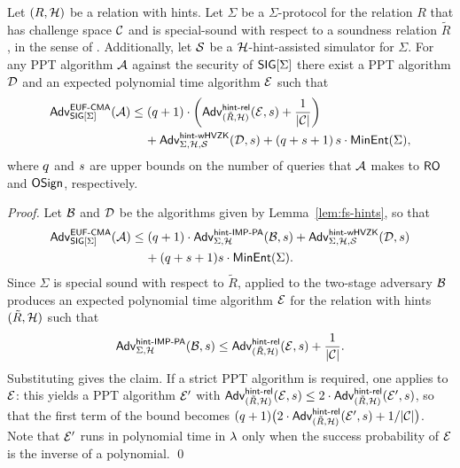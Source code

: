 \begin{theorem}\label{thm:EUFCMA-gen}
    Let $(R, \mathcal{H})$ be a relation with hints.
    Let $\Sigma$ be a $\Sigma$-protocol for the relation $R$ that has challenge
    space $\mathcal{C}$ and is special-sound with respect to a soundness relation
    $\tilde{R}$, in the sense of .
    Additionally, let $\operatorname{\mathcal{S}}$ be a $\mathcal{H}$-hint-assisted simulator for
    $\Sigma$.
    For any PPT algorithm $\mathcal{A}$ against the \EUFCMA security of $\mathsf{SIG}[\Sigma]$
    there exist a PPT algorithm $\mathcal{D}$ and an expected polynomial time algorithm
    $\mathcal{E}$ such that
    \begin{align*}
        \Advantage{\EUFCMA}{\SIG[\Sigma]}(\adv)
        &\leq \left(\numRO+1\right)\cdot
        \left(\hintreladv{\tilde{R}}{\hintdistr}{\cE}{\numOSign}
        + \frac{1}{\lvert \cC \rvert}\right) \\
        &\phantom{\leq ~}
        + \hinthvzkadv{\Sigma}{\hintdistr}{\Sim}{\ddv, \numOSign}
        + (\numRO + \numOSign + 1)\,\numOSign \cdot \minentropy{\Sigma},
    \end{align*}
    where $q$ and $s$ are upper bounds on the number of queries that
    $\mathcal{A}$ makes to $\mathsf{RO}$ and $\mathsf{OSign}$, respectively.
\end{theorem}

\begin{proof}
    Let $\mathcal{B}$ and $\mathcal{D}$ be the algorithms given by Lemma~\ref{lem:fs-hints}, so
    that
    \[
        \begin{aligned}
            \mathsf{Adv}^{\mathsf{EUF}\text{-}\mathsf{CMA}}_{\mathsf{SIG}[\Sigma]}(\mathcal{A})
            &\leq (q+1)\cdot\mathsf{Adv}^{\mathsf{hint}\text{-}\mathsf{IMP}\text{-}\mathsf{PA}}_{\Sigma,\mathcal{H}}(\mathcal{B},s)
            + \mathsf{Adv}^{\mathsf{hint}\text{-}\mathsf{wHVZK}}_{\Sigma,\mathcal{H}, \operatorname{\mathcal{S}}}(\mathcal{D}, s) \\
            &\phantom{\leq ~}
            + (q+s+1)s\cdot\mathsf{MinEnt}(\Sigma).
        \end{aligned}
    \]
    Since $\Sigma$ is special sound with respect to $\tilde{R}$,
     applied to the two-stage adversary $\mathcal{B}$
    produces an expected polynomial time algorithm $\mathcal{E}$ for the relation with
    hints $(\tilde{R}, \mathcal{H})$ such that
    \[
        \hintimppaadv{\Sigma}{\hintdistr}{\bdv}{\numOSign}
        \leq \hintreladv{\tilde{R}}{\hintdistr}{\cE}{\numOSign}
        + \frac{1}{\abs{\cC}}.
    \]
    Substituting gives the claim. If a strict PPT algorithm is required, one
    applies  to $\mathcal{E}$: this yields a PPT algorithm
    $\mathcal{E}'$ with $\mathsf{Adv}^{\mathsf{hint}\text{-}\mathsf{rel}}_{(\tilde{R}, \mathcal{H})}(\mathcal{E}, s) \leq 2 \cdot
    \mathsf{Adv}^{\mathsf{hint}\text{-}\mathsf{rel}}_{(\tilde{R}, \mathcal{H})}(\mathcal{E}', s)$, so that the first term
    of the bound becomes $(q+1)\bigl(2 \cdot
    \mathsf{Adv}^{\mathsf{hint}\text{-}\mathsf{rel}}_{(\tilde{R}, \mathcal{H})}(\mathcal{E}', s) + 1/\lvert \mathcal{C} \rvert\bigr)$.
    Note that $\mathcal{E}'$ runs in polynomial time in $\lambda$ only when the success
    probability of $\mathcal{E}$ is the inverse of a polynomial. \qed
\end{proof}

